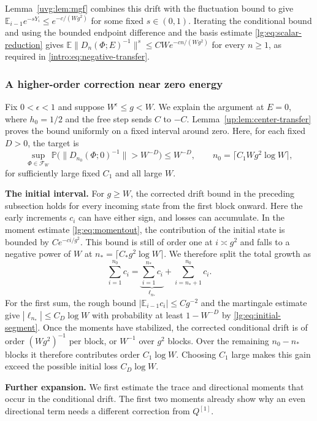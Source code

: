\documentclass[11pt]{article}
\numberwithin{equation}{section}
\theoremstyle{remark}
\newcommand{\E}{\mathbb E}
\newcommand{\Prob}{\mathbb P}
\begin{document}
Lemma~\ref{uvg:lem:mgf} combines this drift with the fluctuation bound to give
$\E_{i-1}e^{-sY_i}\le e^{-c/(Wg^2)}$ for some fixed $s\in(0,1)$.
Iterating the conditional bound and using the bounded endpoint difference
and the basis estimate \eqref{lg:eq:scalar-reduction} gives
$\E\|D_n(\Phi;E)^{-1}\|^s\le CW e^{-cn/(Wg^2)}$ for every $n\ge1$,
as required in \eqref{intro:eq:negative-transfer}.

\subsubsection{A higher-order correction near zero energy}

Fix $0<\epsilon<1$ and suppose $W^\epsilon\le g<W$. We explain the
argument at $E=0$, where $h_0=1/2$ and the free step sends $C$ to $-C$.
Lemma~\ref{up:lem:center-transfer} proves the bound uniformly on a
fixed interval around zero. Here, for each fixed $D>0$, the target is
\[
 \sup_{\Phi\in\mathcal F_W}
 \Prob\bigl(\|D_{n_0}(\Phi;0)^{-1}\|>W^{-D}\bigr)\le W^{-D},
 \qquad n_0=\lceil C_1Wg^2\log W\rceil,
\]
for sufficiently large fixed $C_1$ and all large $W$.

\medskip\noindent\textbf{The initial interval.}
For $g\ge W$, the corrected drift bound in the preceding subsection
holds for every incoming state from the first block onward. Here the
early increments $c_i$ can have either sign, and losses can accumulate.
In the moment estimate \eqref{lg:eq:momentout}, the contribution of the
initial state is bounded by $Ce^{-ci/g^2}$. This bound is still of
order one at $i\asymp g^2$ and falls to a negative power of $W$ at
$n_*=\lceil C_*g^2\log W\rceil$. We therefore split the total growth as
\[
 \sum_{i=1}^{n_0}c_i
 =\underbrace{\sum_{i=1}^{n_*}c_i}_{\ell_{n_*}}
  +\sum_{i=n_*+1}^{n_0}c_i.
\]
For the first sum, the rough bound $|\E_{i-1}c_i|\le Cg^{-2}$ and the
martingale estimate give $|\ell_{n_*}|\le C_D\log W$ with probability
at least $1-W^{-D}$ by \eqref{lg:eq:initial-segment}. Once the moments
have stabilized, the corrected conditional drift is of order
$(Wg^2)^{-1}$ per block, or $W^{-1}$ over $g^2$ blocks. Over the
remaining $n_0-n_*$ blocks it therefore contributes order $C_1\log W$.
Choosing $C_1$ large makes this gain exceed the possible initial loss
$C_D\log W$.

\medskip\noindent\textbf{Further expansion.}
We first estimate the trace and directional moments that occur in the
conditional drift. The first two moments already show why an even
directional term needs a different correction from $Q^{[1]}$.
\end{document}
